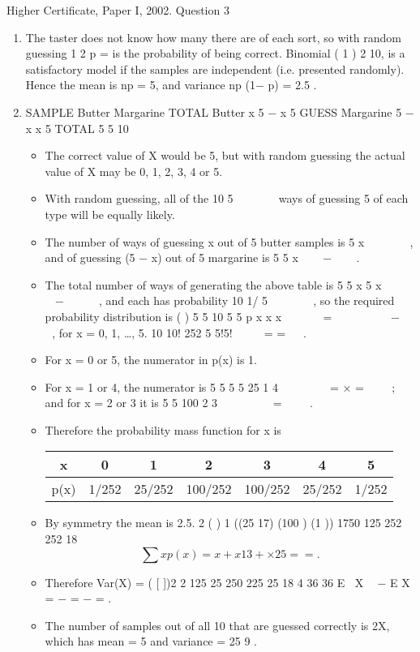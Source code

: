 \documentclass[a4paper,12pt]{article}
\begin{document}
Higher Certificate, Paper I, 2002. Question 3

\begin{enumerate}
\item The taster does not know how many there are of each sort, so with random
guessing 1
2 p = is the probability of being correct. Binomial ( 1 )
2 10, is a satisfactory
model if the samples are independent (i.e. presented randomly). Hence the mean is np
= 5, and variance np (1− p) = 2.5 .
\item  SAMPLE
Butter Margarine TOTAL
Butter x 5 − x 5
GUESS Margarine 5 − x x 5
TOTAL 5 5 10

\begin{itemize}
\item The correct value of X would be 5, but with random guessing the actual value of X
may be 0, 1, 2, 3, 4 or 5.
\item With random guessing, all of the
10
5
 
 
 
ways of guessing 5
of each type will be equally likely. 
\item The number of ways of guessing x out of 5 butter
samples is
5
x
 
 
 
, and of guessing (5 − x) out of 5 margarine is
5
5 x
 
 −   
. 
\item The total
number of ways of generating the above table is
5 5
x 5 x
  
  −    
, and each has probability
10
1/
5
 
 
 
, so the required probability distribution is ( ) 5 5 10
5 5
p x
x x
    
=        −   
, for
x = 0, 1, …, 5.
10 10! 252
5 5!5!
 
  = =
 
. 
\item For x = 0 or 5, the numerator in p(x) is 1. \item For x = 1 or 4, the
numerator is
5 5
5 5 25
1 4
  
   = × =
  
; and for x = 2 or 3 it is
5 5
100
2 3
  
    =
  
. 
\end{itemize}
\begin{itemize}
    \item Therefore the
probability mass function for x is
\begin{center}
\begin{tabular}{|c|c|c|c|c|c|c|}
\hline 
x & 0 & 1& 2& 3& 4& 5\\ \hline
p(x)& 1/252& 25/252& 100/252 &100/252& 25/252 & 1/252\\ \hline 
\end{tabular}
\end{center}

\item By symmetry the mean is 2.5.
2 ( ) 1 ((25 17) (100 ) (1 )) 1750 125
252 252 18
\[ \sum x p(x) = x + x13 + × 25 = = .\]
\item Therefore Var(X) = ( [ ])2 2 125 25 250 225 25
18 4 36 36
E X  − E X = − = − = .
\item The number of samples out of all 10 that are guessed correctly is 2X, which has mean
= 5 and variance = 25
9
.
\end{itemize}

\end{enumerate}
\end{document}
